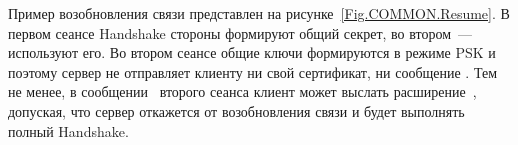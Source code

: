 
Пример возобновления связи представлен на рисунке~\ref{Fig.COMMON.Resume}. 
В первом сеансе Handshake стороны формируют общий секрет, во втором~---
используют его. Во втором сеансе общие ключи формируются в режиме PSK и поэтому 
сервер не отправляет клиенту ни свой сертификат, ни сообщение 
.
%
Тем не менее, в сообщении~ второго сеанса клиент может
выслать расширение~, допуская, что сервер откажется
от возобновления связи и будет выполнять полный Handshake.


 